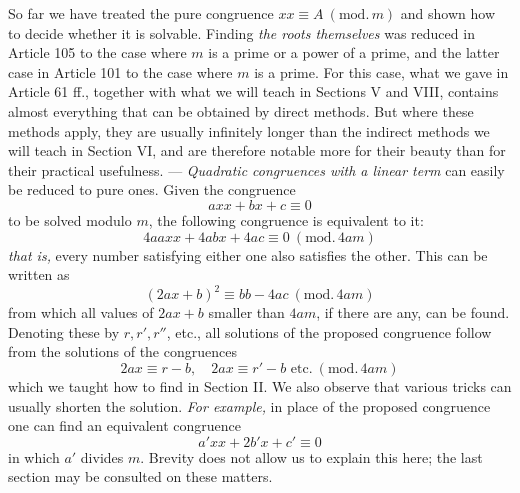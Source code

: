 So far we have treated the pure congruence $xx\equiv A\ (\mathrm{mod.}\,m)$ and shown how to decide whether it is solvable. Finding \textit{the roots themselves} was reduced in Article 105 to the case where $m$ is a prime or a power of a prime, and the latter case in Article 101 to the case where $m$ is a prime. For this case, what we gave in Article 61 ff., together with what we will teach in Sections V and VIII, contains almost everything that can be obtained by direct methods. But where these methods apply, they are usually infinitely longer than the indirect methods we will teach in Section VI, and are therefore notable more for their beauty than for their practical usefulness. --- \textit{Quadratic congruences with a linear term} can easily be reduced to pure ones. Given the congruence
\[
axx+bx+c\equiv 0
\]
to be solved modulo $m$, the following congruence is equivalent to it:
\[
4aaxx+4abx+4ac\equiv 0\ (\mathrm{mod.}\,4am)
\]
\textit{that is,} every number satisfying either one also satisfies the other. This can be written as
\[
(2ax+b)^2\equiv bb-4ac\ (\mathrm{mod.}\,4am)
\]
from which all values of $2ax+b$ smaller than $4am$, if there are any, can be found. Denoting these by $r,r',r''$, etc., all solutions of the proposed congruence follow from the solutions of the congruences
\[
2ax\equiv r-b,\quad 2ax\equiv r'-b\text{ etc.}\ (\mathrm{mod.}\,4am)
\]
which we taught how to find in Section II. We also observe that various tricks can usually shorten the solution. \textit{For example,} in place of the proposed congruence one can find an equivalent congruence
\[
a'xx+2b'x+c'\equiv 0
\]
in which $a'$ divides $m$. Brevity does not allow us to explain this here; the last section may be consulted on these matters.
